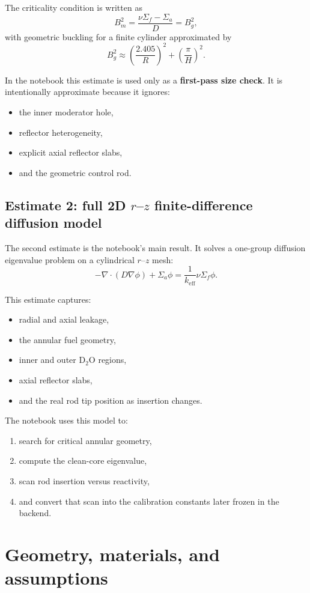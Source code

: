 \documentclass[11pt]{article}
\begin{document}
The criticality condition is written as
\[
B_m^2 = \frac{\nu\Sigma_f - \Sigma_a}{D} = B_g^2,
\]
with geometric buckling for a finite cylinder approximated by
\[
B_g^2 \approx \left(\frac{2.405}{R}\right)^2 + \left(\frac{\pi}{H}\right)^2.
\]

In the notebook this estimate is used only as a \textbf{first-pass size check}.
It is intentionally approximate because it ignores:
\begin{itemize}
  \item the inner moderator hole,
  \item reflector heterogeneity,
  \item explicit axial reflector slabs,
  \item and the geometric control rod.
\end{itemize}

\subsection{Estimate 2: full 2D $r$--$z$ finite-difference diffusion model}

The second estimate is the notebook's main result.  It solves a one-group
diffusion eigenvalue problem on a cylindrical $r$--$z$ mesh:
\[
-\nabla \cdot \left(D \nabla \phi\right) + \Sigma_a \phi
= \frac{1}{k_{\mathrm{eff}}}\nu\Sigma_f \phi.
\]

This estimate captures:
\begin{itemize}
  \item radial and axial leakage,
  \item the annular fuel geometry,
  \item inner and outer D$_2$O regions,
  \item axial reflector slabs,
  \item and the real rod tip position as insertion changes.
\end{itemize}

The notebook uses this model to:
\begin{enumerate}
  \item search for critical annular geometry,
  \item compute the clean-core eigenvalue,
  \item scan rod insertion versus reactivity,
  \item and convert that scan into the calibration constants later frozen in the
        backend.
\end{enumerate}

\section{Geometry, materials, and assumptions}
\end{document}
